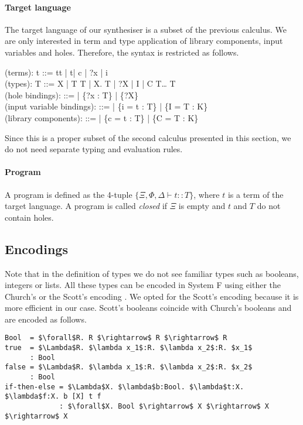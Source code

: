 \paragraph{Target language} The target language of our synthesiser is a subset of the previous calculus. We are only interested in term and type application of library components, input variables and holes. Therefore, the syntax is restricted as follows.
 \begin{plstx}
(terms): t ::= t\;t | t\;[T] | c | ?x | i\\
(types): T ::= X | T \rightarrow T | \forall X.\; T | ?X | I | C\; T\;\ldots\; T\\
(hole bindings): \Xi ::= \emptyset | \Xi \cup \{{?x} : T\} | \Xi \cup \{{?X}\}\\
(input variable bindings): \Phi ::= \emptyset | \Phi \cup \{i = t : T\} | \Phi \cup \{I = T : K\}\\
(library components): \Delta ::= \emptyset | \Delta \cup \{c = t : T\} | \Delta \cup \{C = T : K\}\\
\end{plstx}
Since this is a proper subset of the second calculus presented in this section, we do not need separate typing and evaluation rules.

\paragraph{Program} A program is defined as the 4-tuple $\{\Xi, \Phi, \Delta \vdash t :: T\}$, where $t$ is a term of the target language. A program is called \emph{closed} if $\Xi$ is empty and $t$ and $T$ do not contain holes.


  \subsection{Encodings}
Note that in the definition of types we do not see familiar types such as booleans, integers or lists. All these types can be encoded in System F using either the Church's or the Scott's encoding \cite{ScottNumerals}. We opted for the Scott's encoding because it is more efficient in our case.
Scott's booleans coincide with Church's booleans and are encoded as follows.
\begin{lstlisting}[style=plain, mathescape]
Bool  = $\forall$R. R $\rightarrow$ R $\rightarrow$ R
true  = $\Lambda$R. $\lambda x_1$:R. $\lambda x_2$:R. $x_1$
      : Bool
false = $\Lambda$R. $\lambda x_1$:R. $\lambda x_2$:R. $x_2$
      : Bool
if-then-else = $\Lambda$X. $\lambda$b:Bool. $\lambda$t:X. $\lambda$f:X. b [X] t f
             : $\forall$X. Bool $\rightarrow$ X $\rightarrow$ X $\rightarrow$ X
\end{lstlisting}

